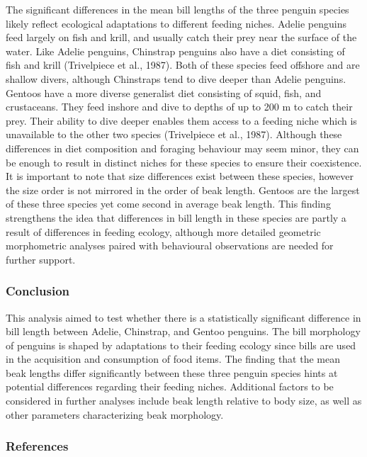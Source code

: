 \documentclass[
]{article}
\begin{document}
The significant differences in the mean bill lengths of the three
penguin species likely reflect ecological adaptations to different
feeding niches. Adelie penguins feed largely on fish and krill, and
usually catch their prey near the surface of the water. Like Adelie
penguins, Chinstrap penguins also have a diet consisting of fish and
krill (Trivelpiece et al., 1987). Both of these species feed offshore
and are shallow divers, although Chinstraps tend to dive deeper than
Adelie penguins. Gentoos have a more diverse generalist diet consisting
of squid, fish, and crustaceans. They feed inshore and dive to depths of
up to 200 m to catch their prey. Their ability to dive deeper enables
them access to a feeding niche which is unavailable to the other two
species (Trivelpiece et al., 1987). Although these differences in diet
composition and foraging behaviour may seem minor, they can be enough to
result in distinct niches for these species to ensure their coexistence.
It is important to note that size differences exist between these
species, however the size order is not mirrored in the order of beak
length. Gentoos are the largest of these three species yet come second
in average beak length. This finding strengthens the idea that
differences in bill length in these species are partly a result of
differences in feeding ecology, although more detailed geometric
morphometric analyses paired with behavioural observations are needed
for further support.

\subsubsection{Conclusion}\label{conclusion}

This analysis aimed to test whether there is a statistically significant
difference in bill length between Adelie, Chinstrap, and Gentoo
penguins. The bill morphology of penguins is shaped by adaptations to
their feeding ecology since bills are used in the acquisition and
consumption of food items. The finding that the mean beak lengths differ
significantly between these three penguin species hints at potential
differences regarding their feeding niches. Additional factors to be
considered in further analyses include beak length relative to body
size, as well as other parameters characterizing beak morphology.

\subsubsection{References}\label{references}
\end{document}
